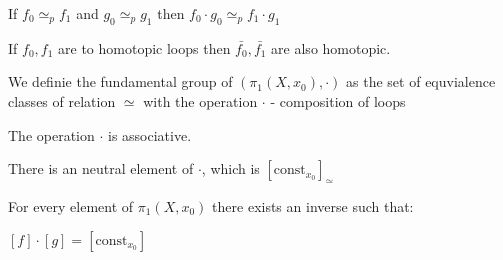     \begin{lemma}
        \label{lem:loop_comp_homoclass}

        If $f_0 \simeq_p f_1$ and $g_0 \simeq_p g_1$ then $f_0 \cdot g_0 \simeq_p f_1 \cdot g_1$ 
    \end{lemma}

    \begin{lemma}
        \label{lem:loop_inverse_homoclass}

        If $f_0,f_1$ are to homotopic loops then $\bar{f_0}, \bar{f_1}$ are also homotopic.
    \end{lemma}

    \begin{definition}
        \label{def:fundamental_group}

        We definie the fundamental group of $(\pi_1(X, x_0),\cdot)$ as the set of equvialence classes of relation $\simeq$ with 
        the operation $\cdot$ - composition of loops
    \end{definition}

    \begin{lemma}
        \label{lem:loop_comp_assoc}

        The operation $\cdot$ is associative.
    \end{lemma}

    \begin{lemma}
        \label{lem:loop_comp_neutral}
        
        There is an neutral element of $\cdot$, which is $[\text{const}_{x_0}]_{\simeq}$
    \end{lemma}

    \begin{lemma}
        \label{lem:loop_comp_inv}

        For every element of $\pi_1(X, x_0)$ there exists an inverse such that: 

        $[f] \cdot [g] = [\text{const}_{x_0}]$
    \end{lemma}
    
